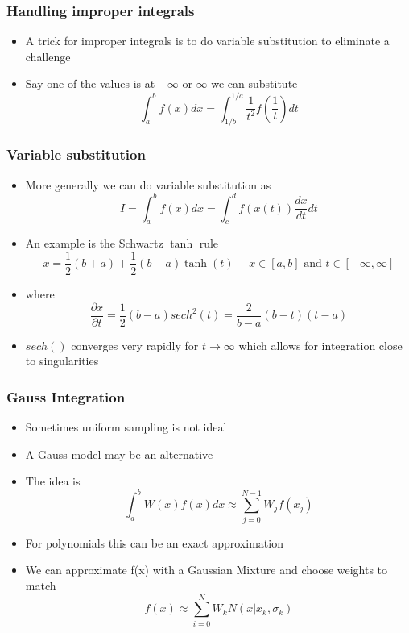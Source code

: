 \documentclass[10pt]{beamer}
\begin{document}
\begin{frame}
  \frametitle{Handling improper integrals}
  \begin{itemize}
  \item A trick for improper integrals is to do variable substitution to eliminate a challenge
  \item Say one of the values is at $-\infty$ or $\infty$ we can substitute
    \[
      \int_a^b f(x) dx = \int_{1/b}^{1/a} \frac{1}{t^2} f\left( \frac{1}{t} \right) dt
    \]
  \end{itemize}
\end{frame}

\begin{frame}
  \frametitle{Variable substitution}
  \begin{itemize}
  \item More generally we can do variable substitution as
    \[
      I = \int_a^b f(x) dx = \int_c^d f(x(t)) \frac{dx}{dt} dt
    \]
  \item An example is the Schwartz $\tanh$ rule
    \[
      x = \frac{1}{2} (b+a) + \frac{1}{2} (b-a) \tanh(t) \mbox{~~~ } x\in[a,b] \mbox{ and } t\in[-\infty,\infty]
    \]
  \item where
    \[
      \frac{\partial x}{\partial t} = \frac{1}{2} (b-a) sech^2(t) = \frac{2}{b-a} (b-t) (t-a)
    \]
  \item $sech()$ converges very rapidly for $t\rightarrow \infty$ which allows for integration close to singularities
  \end{itemize}
\end{frame}

\begin{frame}
  \frametitle{Gauss Integration}
  \begin{itemize}
  \item Sometimes uniform sampling is not ideal
  \item A Gauss model may be an alternative
  \item The idea is
    \[
      \int_a^b W(x) f(x) dx \approx \sum_{j=0}^{N-1} W_j f(x_j)
    \]
  \item For polynomials this can be an exact approximation
  \item We can approximate f(x) with a Gaussian Mixture and choose weights to match
    \[
      f(x) \approx \sum_{i=0}^N W_k N(x | x_k, \sigma_k)
    \]
  \end{itemize}
\end{frame}
\end{document}
